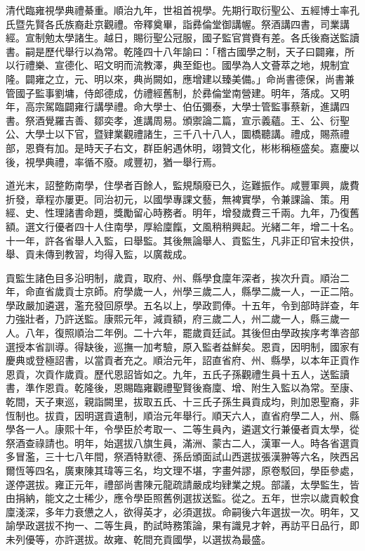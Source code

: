 \begin{pinyinscope}
清代臨雍視學典禮綦重。順治九年，世祖首視學。先期行取衍聖公、五經博士率孔氏暨先賢各氏族裔赴京觀禮。帝釋奠畢，詣彞倫堂御講幄。祭酒講四書，司業講經。宣制勉太學諸生。越日，賜衍聖公冠服，國子監官賞賚有差。各氏後裔送監讀書。嗣是歷代舉行以為常。乾隆四十八年諭曰：「稽古國學之制，天子曰闢雍，所以行禮樂、宣德化、昭文明而流教澤，典至鉅也。國學為人文薈萃之地，規制宜隆。闢雍之立，元、明以來，典尚闕如，應增建以臻美備。」命尚書德保，尚書兼管國子監事劉墉，侍郎德成，仿禮經舊制，於彞倫堂南營建。明年，落成。又明年，高宗駕臨闢雍行講學禮。命大學士、伯伍彌泰，大學士管監事蔡新，進講四書。祭酒覺羅吉善、鄒奕孝，進講周易。頒禦論二篇，宣示義蘊。王、公、衍聖公、大學士以下官，暨肄業觀禮諸生，三千八十八人，圜橋聽講。禮成，賜燕禮部，恩賚有加。是時天子右文，群臣躬遇休明，翊贊文化，彬彬稱極盛矣。嘉慶以後，視學典禮，率循不廢。咸豐初，猶一舉行焉。

道光末，詔整飭南學，住學者百餘人，監規頹廢已久，迄難振作。咸豐軍興，歲費折發，章程亦屢更。同治初元，以國學專課文藝，無裨實學，令兼課論、策。用經、史、性理諸書命題，獎勵留心時務者。明年，增發歲費三千兩。九年，乃復舊額。選文行優者四十人住南學，厚給廩餼，文風稍稍興起。光緒二年，增二十名。十一年，許各省舉人入監，曰舉監。其後無論舉人、貢監生，凡非正印官未投供，舉、貢未傳到教習，均得入監，以廣裁成。

貢監生諸色目多沿明制，歲貢，取府、州、縣學食廩年深者，挨次升貢。順治二年，命直省歲貢士京師。府學歲一人，州學三歲二人，縣學二歲一人，一正二陪。學政嚴加遴選，濫充發回原學。五名以上，學政罰俸。十五年，令到部時詳查，年力強壯者，乃許送監。康熙元年，減貢額，府三歲二人，州二歲一人，縣三歲一人。八年，復照順治二年例。二十六年，罷歲貢廷試。其後但由學政挨序考準咨部選授本省訓導。得缺後，巡撫一加考驗，原入監者益鮮矣。恩貢，因明制，國家有慶典或登極詔書，以當貢者充之。順治元年，詔直省府、州、縣學，以本年正貢作恩貢，次貢作歲貢。歷代恩詔皆如之。九年，五氏子孫觀禮生員十五人，送監讀書，準作恩貢。乾隆後，恩賜臨雍觀禮聖賢後裔廩、增、附生入監以為常。至康、乾間，天子東巡，親詣闕里，拔取五氏、十三氏子孫生員貢成均，則加恩聖裔，非恆制也。拔貢，因明選貢遺制，順治元年舉行。順天六人，直省府學二人，州、縣學各一人。康熙十年，令學臣於考取一、二等生員內，遴選文行兼優者貢太學，從祭酒查祿請也。明年，始選拔八旗生員，滿洲、蒙古二人，漢軍一人。時各省選貢多冒濫，三十七八年間，祭酒特默德、孫岳頒面試山西選拔張漢翀等六名，陜西呂爾恆等四名，廣東陳其瑋等三名，均文理不堪，字畫舛謬，原卷駁回，學臣參處，遂停選拔。雍正元年，禮部尚書陳元龍疏請嚴成均肄業之規。部議，太學監生，皆由捐納，能文之士稀少，應令學臣照舊例選拔送監。從之。五年，世宗以歲貢較食廩淺深，多年力衰憊之人，欲得英才，必須選拔。命嗣後六年選拔一次。明年，又諭學政選拔不拘一、二等生員，酌試時務策論，果有識見才幹，再訪平日品行，即未列優等，亦許選拔。故雍、乾間充貢國學，以選拔為最盛。


\end{pinyinscope}
